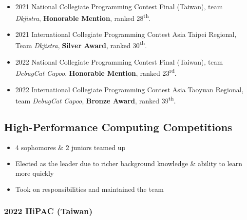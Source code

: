 \documentclass[12pt, a4paper]{article}
\begin{document}
\begin{itemize}
\item 2021 National Collegiate Programming Contest Final (Taiwan), team \emph{Dkjistra}, \textbf{Honorable Mention}, ranked 28\textsuperscript{th}.
\item 2021 International Collegiate Programming Contest Asia Taipei Regional, Team \emph{Dkjistra}, \textbf{Silver Award}, ranked 30\textsuperscript{th}.
\item 2022 National Collegiate Programming Contest Final (Taiwan), team \emph{DebugCat Capoo}, \textbf{Honorable Mention}, ranked 23\textsuperscript{rd}.
\item 2022 International Collegiate Programming Contest Asia Taoyuan Regional, team \emph{DebugCat Capoo}, \textbf{Bronze Award}, ranked 39\textsuperscript{th}.
\end{itemize}

\subsection{High-Performance Computing Competitions}


\begin{itemize}
\item 4 sophomores \& 2 juniors teamed up
\item Elected as the leader due to richer background knowledge \& ability to learn more quickly
\item Took on responsibilities and maintained the team
\end{itemize}

\subsubsection{2022 HiPAC (Taiwan)}

\end{document}

